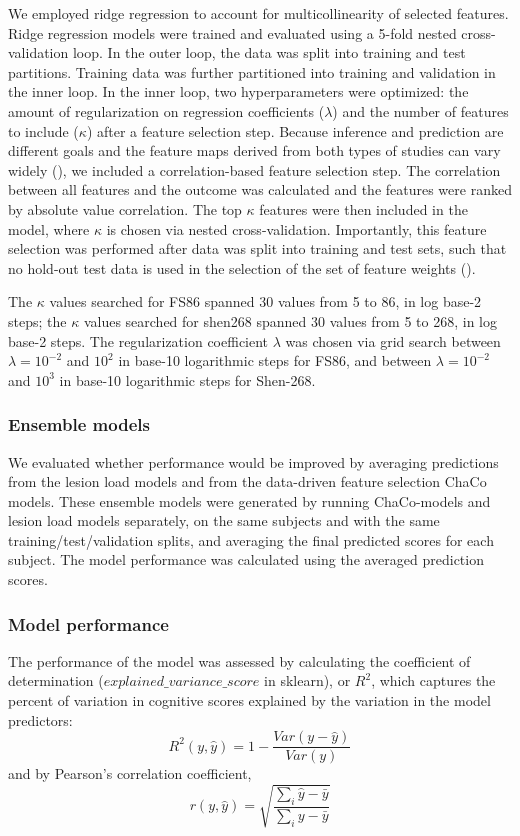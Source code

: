 \documentclass[10pt]{article}
\begin{document}
We employed ridge regression to account for multicollinearity of selected features. Ridge regression models were trained and evaluated using a 5-fold nested cross-validation loop. In the outer loop, the data was split into training and test partitions. Training data was further partitioned into training and validation in the inner loop. In the inner loop, two hyperparameters were optimized: the amount of regularization on regression coefficients ($\lambda$) and the number of features to include ($\kappa$) after a feature selection step. 
Because inference and prediction are different goals and the feature maps derived from both types of studies can vary widely (\cite{Sperber2021-lw, Bzdok2020-py}), we included a correlation-based feature selection step. 
The correlation between all features and the outcome was calculated and the features were ranked by absolute value correlation. The top $\kappa$ features were then included in the model, where $\kappa$ is chosen via nested cross-validation. Importantly, this feature selection was performed after data was split into training and test sets, such that no hold-out test data is used in the selection of the set of feature weights (\cite{Hastie2001-or}). 
 
 
The $\kappa$ values searched for FS86 spanned 30 values from 5 to 86, in log base-2 steps; the $\kappa$ values searched for shen268 spanned 30 values from 5 to 268, in log base-2 steps. The regularization coefficient $\lambda$ was chosen via grid search between $\lambda = 10^{-2}$ and $10^2$ in base-10 logarithmic steps for FS86, and between $\lambda = 10^{-2}$ and $10^3$ in base-10 logarithmic steps for Shen-268. 

\subsubsection{Ensemble models}
We evaluated whether performance would be improved by averaging predictions from the lesion load models and from the data-driven feature selection ChaCo models. These ensemble models were generated by running ChaCo-models and lesion load models separately, on the same subjects and with the same training/test/validation splits, and averaging the final predicted scores for each subject. The model performance was calculated using the averaged prediction scores.

\subsubsection{Model performance}
The performance of the model was assessed by calculating the coefficient of determination ($explained\_variance\_score$ in sklearn), or $R^2$, which captures the percent of variation in cognitive scores explained by the variation in the model predictors:
\begin{equation}
    R^2(y, \hat{y}) = 1 - \frac{Var(y-\hat{y})}{Var(y)}
\end{equation}
and by Pearson's correlation coefficient, 
\begin{equation}
    r(y, \hat{y}) = \sqrt{\frac{\sum_i{\hat{y}-\bar{y}}}{\sum_i{y-\bar{y}}}}
\end{equation}
\end{document}
